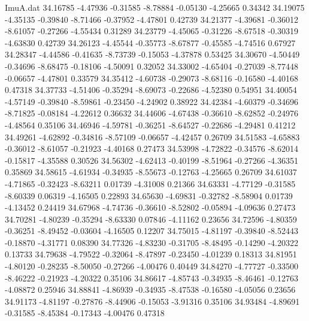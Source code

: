 \begin{filecontents}{ImuA.dat}
  34.16785   -4.47936   -0.31585   -8.78884   -0.05130   -4.25665    0.34342
  34.19075   -4.35135   -0.39840   -8.71466   -0.37952   -4.47801    0.42739
  34.21377   -4.39681   -0.36012   -8.61057   -0.27266   -4.55434    0.31289
  34.23779   -4.45065   -0.31226   -8.67518   -0.30319   -4.63830    0.42739
  34.26123   -4.45544   -0.35773   -8.67877   -0.45585   -4.74516    0.67927
  34.28347   -4.44586   -0.41635   -8.73739   -0.15053   -4.37878    0.53425
  34.30670   -4.50449   -0.34696   -8.68475   -0.18106   -4.50091    0.32052
  34.33002   -4.65404   -0.27039   -8.77448   -0.06657   -4.47801    0.33579
  34.35412   -4.60738   -0.29073   -8.68116   -0.16580   -4.40168    0.47318
  34.37733   -4.51406   -0.35294   -8.69073   -0.22686   -4.52380    0.54951
  34.40054   -4.57149   -0.39840   -8.59861   -0.23450   -4.24902    0.38922
  34.42384   -4.60379   -0.34696   -8.71825   -0.08184   -4.22612    0.36632
  34.44606   -4.67438   -0.36610   -8.62852   -0.24976   -4.48564    0.35106
  34.46946   -4.59781   -0.36251   -8.64527   -0.22686   -4.29481    0.41212
  34.49261   -4.62892   -0.34816   -8.57109   -0.06657   -4.42457    0.26709
  34.51583   -4.65883   -0.36012   -8.61057   -0.21923   -4.40168    0.27473
  34.53998   -4.72822   -0.34576   -8.62014   -0.15817   -4.35588    0.30526
  34.56302   -4.62413   -0.40199   -8.51964   -0.27266   -4.36351    0.35869
  34.58615   -4.61934   -0.34935   -8.55673   -0.12763   -4.25665    0.26709
  34.61037   -4.71865   -0.32423   -8.63211    0.01739   -4.31008    0.21366
  34.63331   -4.77129   -0.31585   -8.60339    0.06319   -4.16505    0.22893
  34.65630   -4.69831   -0.32782   -8.58904    0.01739   -4.13452    0.24419
  34.67968   -4.74736   -0.36610   -8.52802   -0.05894   -4.09636    0.27473
  34.70281   -4.80239   -0.35294   -8.63330    0.07846   -4.11162    0.23656
  34.72596   -4.80359   -0.36251   -8.49452   -0.03604   -4.16505    0.12207
  34.75015   -4.81197   -0.39840   -8.52443   -0.18870   -4.31771    0.08390
  34.77326   -4.83230   -0.31705   -8.48495   -0.14290   -4.20322    0.13733
  34.79638   -4.79522   -0.32064   -8.47897   -0.23450   -4.01239    0.18313
  34.81951   -4.80120   -0.28235   -8.50050   -0.27266   -4.00476    0.40449
  34.84270   -4.77727   -0.33500   -8.46222   -0.21923   -4.20322    0.35106
  34.86617   -4.85743   -0.34935   -8.46461   -0.12763   -4.08872    0.25946
  34.88841   -4.86939   -0.34935   -8.47538   -0.16580   -4.05056    0.23656
  34.91173   -4.81197   -0.27876   -8.44906   -0.15053   -3.91316    0.35106
  34.93484   -4.89691   -0.31585   -8.45384   -0.17343   -4.00476    0.47318

\end{filecontents}
